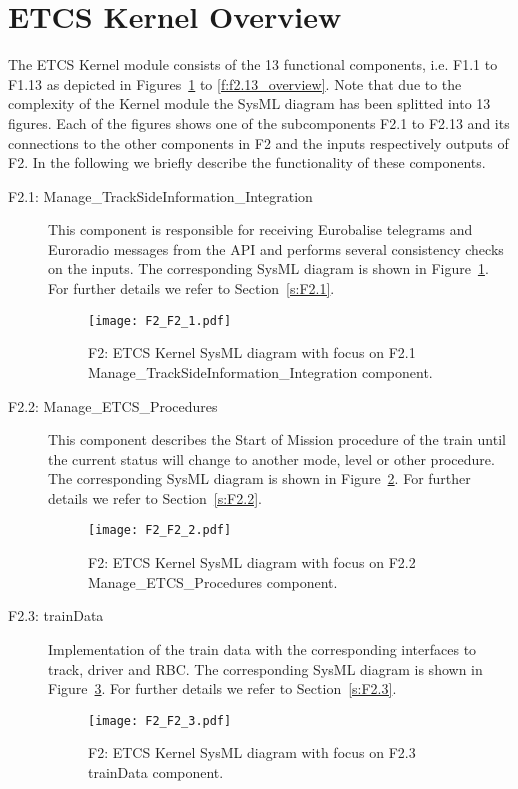 \section{ETCS Kernel Overview}\label{s:ETCS_Kernel_Overview}

The ETCS Kernel module consists of the 13 functional components, i.e. F1.1 to F1.13 as depicted in Figures~\ref{f:f2.1_overview} to \ref{f:f2.13_overview}. Note that due to the complexity of the Kernel module the SysML diagram has been splitted into 13 figures. Each of the figures shows one of the subcomponents F2.1 to F2.13 and its connections to the other components in F2 and the inputs respectively outputs of F2. In the following we briefly describe the functionality of these components.
\begin{description}
\item[F2.1: Manage\_TrackSideInformation\_Integration] This component is responsible for receiving Eurobalise telegrams and Euroradio messages from the API and performs several consistency checks on the inputs. The corresponding SysML diagram is shown in Figure~\ref{f:f2.1_overview}. For further details we refer to Section~\ref{s:F2.1}.
\begin{figure}
\center
\texttt{[image: F2\_F2\_1.pdf]}
\caption{F2: ETCS Kernel SysML diagram with focus on F2.1 Manage\_TrackSideInformation\_Integration component.}\label{f:f2.1_overview}
\end{figure}

\item[F2.2: Manage\_ETCS\_Procedures] This component describes the Start of Mission procedure of the train until the current status will change to another mode, level or other procedure. The corresponding SysML diagram is shown in Figure~\ref{f:f2.2_overview}. For further details we refer to Section~\ref{s:F2.2}.
\begin{figure}
\center
\texttt{[image: F2\_F2\_2.pdf]}
\caption{F2: ETCS Kernel SysML diagram with focus on F2.2 Manage\_ETCS\_Procedures component.}\label{f:f2.2_overview}
\end{figure}

\item[F2.3: trainData] Implementation of the train data with the corresponding interfaces to track, driver and RBC. The corresponding SysML diagram is shown in Figure~\ref{f:f2.3_overview}. For further details we refer to Section~\ref{s:F2.3}.
\begin{figure}
\center
\texttt{[image: F2\_F2\_3.pdf]}
\caption{F2: ETCS Kernel SysML diagram with focus on F2.3 trainData component.}\label{f:f2.3_overview}
\end{figure}


\end{description}

